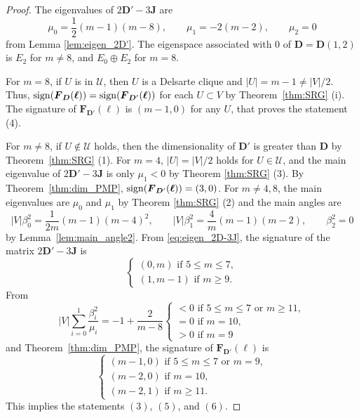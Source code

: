 \documentclass[a4paper, 11pt]{article}
\newcommand{\J}{\boldsymbol{J}}
\newcommand{\D}{\boldsymbol{D}}
\newcommand{\F}{\boldsymbol{F}}
\newcommand{\el}{\boldsymbol{\ell}}
\theoremstyle{definition}
\begin{document}
\begin{proof}
The eigenvalues of $2 \D'-3\J$ are  
\begin{equation} \label{eq:eigen_2D-3J}
\mu_0=\frac{1}{2}(m-1)(m-8), \qquad  
\mu_1=-2(m-2), \qquad \mu_2=0    
\end{equation}
from Lemma \ref{lem:eigen_2D'}. 
The eigenspace associated with 0 of $\D=\D(1,2)$ is $E_2$ for $m\ne 8$, and $E_0 \oplus E_2$ for $m=8$. 

For $m=8$, if $U$ is in $\mathcal{U}$, then $U$ is a Delsarte clique and $|U|=m-1\ne |V|/2$. Thus, ${\rm sign}(\F_{\D}(\el)) = {\rm sign}(\F_{\D'}(\el))$ for each $U\subset V$ by Theorem~\ref{thm:SRG} (i). 
The signature of $\F_{\D'}(\el)$ is $(m-1,0)$ for any $U$, that proves the statement (4). 

For $m\ne 8$, 
if $U \not\in \mathcal{U}$ holds, then
the dimensionality of $\D'$ is greater than $\D$ by Theorem~\ref{thm:SRG} (1). 
For $m=4$, $|U|=|V|/2$ holds for $U \in \mathcal{U}$, and the main eigenvalue of $2\D'-3 \J$ is only $\mu_1<0$ by Theorem \ref{thm:SRG} (3). 
By Theorem~\ref{thm:dim_PMP}, ${\rm sign} (\F_{\D'}(\el))=(3,0)$.  
For $m\ne 4,8$, the main eigenvalues are $\mu_0$ and $\mu_1$ by Theorem \ref{thm:SRG} (2) and 
the main angles are  
\[
|V|\beta_0^2=\frac{1}{2m}(m-1)(m-4)^2, \qquad 
|V|\beta_1^2=\frac{4}{m}(m-1)(m-2), \qquad
\beta_2^2=0
\] 
by Lemma~\ref{lem:main_angle2}. 
From \eqref{eq:eigen_2D-3J}, the signature of the matrix $2\D'-3 \J$ is 
\[
\begin{cases}
(0,m) \text{ if $5 \leq m \leq 7$},\\
(1,m-1) \text{ if $m\geq 9$}.   
\end{cases}
\]
From 
\[
|V|\sum_{i=0}^1\frac{\beta_i^2}{\mu_i}=
-1+\frac{2}{m-8}\begin{cases}
<0 \text{ if $5 \leq m \leq 7$ or $m\geq 11$},\\
=0 \text{ if $m = 10$},\\
>0 \text{ if $m= 9$}
\end{cases}
\]
and Theorem~\ref{thm:dim_PMP}, 
the signature of $\F_{\D'}(\el)$ is 
\[
\begin{cases}
(m-1,0) \text{ if $5 \leq m \leq 7$ or $m=9$},\\
(m-2,0)\text{ if $m = 10$},\\
(m-2,1) \text{ if $m\geq 11$}.   
\end{cases}
\]
This implies the statements $(3)$, $(5)$, and $(6)$. 


\end{proof}
\end{document}
